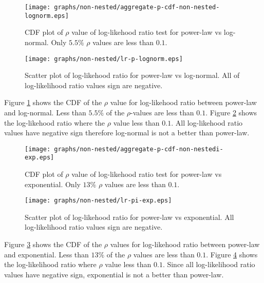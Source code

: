 \documentclass[paper]{ieice}
\begin{document}
\begin{figure}[tb]
\begin{center}
\texttt{[image: graphs/non-nested/aggregate-p-cdf-non-nested-lognorm.eps]}
\end{center}
\caption{CDF plot of $\rho$ value of log-likehood ratio test for power-law vs log-normal. Only $5.5\%$ $\rho$ values are less than $0.1$.}
\label{fig:cdf-p-lognorm}
\end{figure}
\begin{figure}[tb]
\begin{center}
\texttt{[image: graphs/non-nested/lr-p-lognorm.eps]}
\end{center}
\caption{Scatter plot of log-likehood ratio for power-law vs log-normal. All of log-likelihood ratio values sign are negative.}
\label{fig:scatter-lognorm}
\end{figure}

Figure \ref{fig:cdf-p-lognorm} shows the CDF of the $\rho$ value for log-likehood ratio between power-law and log-normal.  
Less than $5.5\%$ of the $\rho$-values are less than $0.1$.   
Figure \ref{fig:scatter-lognorm} shows the log-likehood ratio where the $\rho$ value less than $0.1$. 
All log-likehood ratio values have negative sign therefore log-normal is not a better than power-law.

\begin{figure}[tb]
\begin{center}
\texttt{[image: graphs/non-nested/aggregate-p-cdf-non-nestedi-exp.eps]}
\end{center}
\caption{CDF plot of $\rho$ value of log-likehood ratio test for power-law vs exponential. Only $13\%$ $\rho$ values are less than $0.1$.}
\label{fig:cdf-p-exp}
\end{figure}
\begin{figure}[tb]
\begin{center}
\texttt{[image: graphs/non-nested/lr-pi-exp.eps]}
\end{center}
\caption{Scatter plot of log-likehood ratio for power-law vs exponential. All log-likelihood ratio values sign are negative.}
\label{fig:scatter-exp}
\end{figure}

Figure \ref{fig:cdf-p-exp} shows the CDF of the $\rho$ values for log-likehood ratio between power-law and exponential. 
Less than $13\%$ of the $\rho$ values are less than $0.1$.   
Figure \ref{fig:scatter-exp} shows the log-likelihood ratio where $\rho$ value less than $0.1$. 
Since all log-likelihood ratio values have negative sign, exponential is not a better than power-law.
\end{document}
